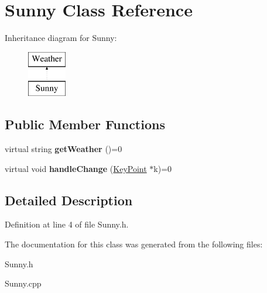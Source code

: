 \hypertarget{classSunny}{}\section{Sunny Class Reference}
\label{classSunny}
Inheritance diagram for Sunny\+:\begin{figure}[H]
\begin{center}
\leavevmode
\includegraphics[height=2.000000cm]{classSunny}
\end{center}
\end{figure}
\subsection*{Public Member Functions}
\begin{DoxyCompactItemize}
\item 
\mbox{\label{classSunny_a2bd2e638310ceaa01fe9cce7ac233524}} 
virtual string {\bfseries get\+Weather} ()=0
\item 
\mbox{\label{classSunny_aa641a4835c80cdc99c3ba3bbedede91c}} 
virtual void {\bfseries handle\+Change} (\hyperlink{classKeyPoint}{Key\+Point} $\ast$k)=0
\end{DoxyCompactItemize}


\subsection{Detailed Description}


Definition at line 4 of file Sunny.\+h.



The documentation for this class was generated from the following files\+:\begin{DoxyCompactItemize}
\item 
Sunny.\+h\item 
Sunny.\+cpp\end{DoxyCompactItemize}
